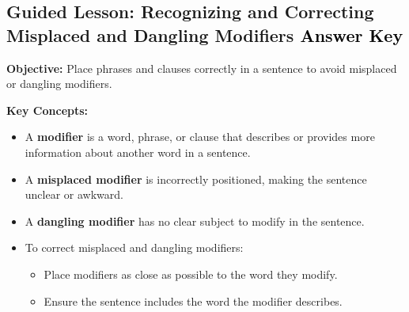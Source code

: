 \documentclass[12pt]{article}
\title{}
\date{}
\begin{document}
\subsection*{Guided Lesson: Recognizing and Correcting Misplaced and Dangling Modifiers \textcolor{black}{Answer Key}}
\onehalfspacing

\begin{tcolorbox}[colframe=black!40, colback=gray!5, 
coltitle=black, colbacktitle=black!20, fonttitle=\bfseries\Large, 
title=Learning Objective, halign title=center, left=5pt, right=5pt, top=5pt, bottom=15pt]
\textbf{Objective:} Place phrases and clauses correctly in a sentence to avoid misplaced or dangling modifiers.
\end{tcolorbox}

\vspace{1em}

\begin{tcolorbox}[colframe=black!60, colback=white, 
coltitle=black, colbacktitle=black!15, fonttitle=\bfseries\Large, 
title=Key Concepts and Vocabulary, halign title=center, left=10pt, right=10pt, top=10pt, bottom=15pt]
\textbf{Key Concepts:}
\begin{itemize}
    \item A \textbf{modifier} is a word, phrase, or clause that describes or provides more information about another word in a sentence.
    \item A \textbf{misplaced modifier} is incorrectly positioned, making the sentence unclear or awkward.
    \item A \textbf{dangling modifier} has no clear subject to modify in the sentence.
    \item To correct misplaced and dangling modifiers:
    \begin{itemize}
        \item Place modifiers as close as possible to the word they modify.
        \item Ensure the sentence includes the word the modifier describes.
    \end{itemize}
\end{itemize}
\end{tcolorbox}

\vspace{1em}
\end{document}
